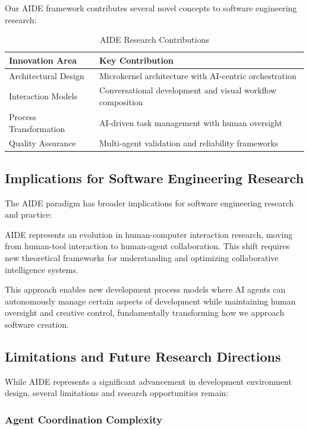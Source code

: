 Our AIDE framework contributes several novel concepts to software engineering research:

\begin{table}[ht]
\centering
\begin{tabular}{@{}ll@{}}
\toprule
\textbf{Innovation Area} & \textbf{Key Contribution} \\
\midrule
Architectural Design & Microkernel architecture with AI-centric orchestration \\
Interaction Models & Conversational development and visual workflow composition \\
Process Transformation & AI-driven task management with human oversight \\
Quality Assurance & Multi-agent validation and reliability frameworks \\
\bottomrule
\end{tabular}
\caption{AIDE Research Contributions}
\end{table}

\subsection{Implications for Software Engineering Research}

The AIDE paradigm has broader implications for software engineering research and practice:

\begin{infobox}[title=Research Impact]
AIDE represents an evolution in human-computer interaction research, moving from human-tool interaction to human-agent collaboration. This shift requires new theoretical frameworks for understanding and optimizing collaborative intelligence systems.
\end{infobox}

This approach enables new development process models where AI agents can autonomously manage certain aspects of development while maintaining human oversight and creative control, fundamentally transforming how we approach software creation.

\subsection{Limitations and Future Research Directions}

While AIDE represents a significant advancement in development environment design, several limitations and research opportunities remain:

\subsubsection{Agent Coordination Complexity}

